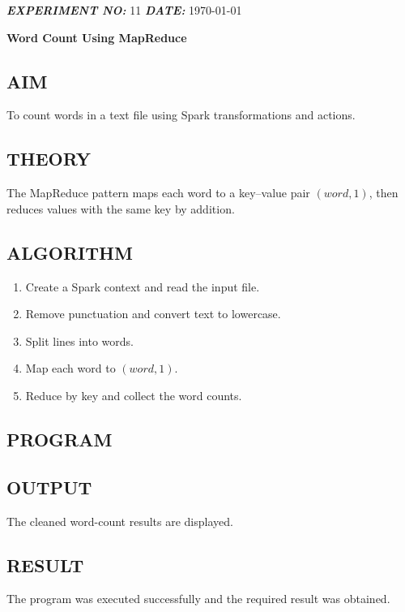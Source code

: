 \documentclass[12pt,a4paper]{article}
\newcommand{\labheader}[2]{%
    \noindent\textit{\fontsize{11}{13}\selectfont\textbf{EXPERIMENT NO:}} #1
    \hfill
    \textit{\fontsize{11}{13}\selectfont\textbf{DATE:}} #2
    \par\vspace{1.5cm}
}
\newcommand{\labtitle}[1]{%
    \begin{center}
        {\bfseries\fontsize{16}{19}\selectfont #1}
    \end{center}
    \vspace{0.7cm}
}
\newcommand{\labheading}[1]{%
    \subsection*{#1}
    \vspace{0.15cm}
}
\newcommand{\experiment}[8]{%
    \clearpage
    \labheader{#1}{\today}
    \labtitle{#2}

    \labheading{AIM}
    {\fontsize{12}{15}\selectfont #3\par}

    \labheading{THEORY}
    {\fontsize{12}{15}\selectfont #4\par}

    \labheading{ALGORITHM}
    {\fontsize{12}{15}\selectfont
    \begin{enumerate}
        #5
    \end{enumerate}
    }

    \labheading{PROGRAM}
    

    \labheading{OUTPUT}
    {\fontsize{12}{15}\selectfont #8\par}

    \labheading{RESULT}
    {\fontsize{12}{15}\selectfont The program was executed successfully and the required result was obtained.\par}
}
\begin{document}
\experiment{11}
{Word Count Using MapReduce}
{To count words in a text file using Spark transformations and actions.}
{The MapReduce pattern maps each word to a key--value pair \((word,1)\), then reduces values with the same key by addition.}
{
    \item Create a Spark context and read the input file.
    \item Remove punctuation and convert text to lowercase.
    \item Split lines into words.
    \item Map each word to \((word,1)\).
    \item Reduce by key and collect the word counts.
}
{word_count.py}
{Python}
{The cleaned word-count results are displayed.}
\end{document}
